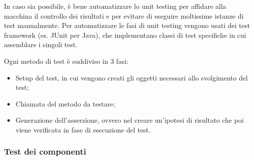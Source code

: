 \documentclass[a4paper, 10pt]{article}
\begin{document}
	In caso sia possibile, è bene automatizzare lo unit testing per affidare alla macchina il controllo dei risultati e per evitare di eseguire moltissime istanze di test manualmente. Per automatizzare le fasi di unit testing vengono usati dei test framework (es. JUnit per Java), che implementano classi di test specifiche in cui assemblare i singoli test.
	
	Ogni metodo di test è suddiviso in 3 fasi:
	\begin{itemize}
		\item Setup del test, in cui vengono creati gli oggetti necessari allo svolgimento del test;
		\item Chiamata del metodo da testare;
		\item Generazione dell'asserzione, ovvero nel creare un'ipotesi di risultato che poi viene verificata in fase di esecuzione del test.
	\end{itemize}

	\subsubsection{Test dei componenti}
	
	
	
\end{document}
